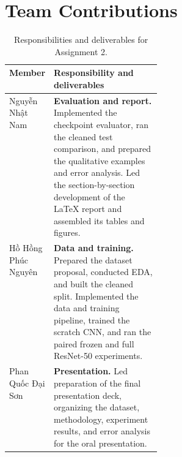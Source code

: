 \section{Team Contributions}
\label{app:a2-team-contributions}

\begin{table}[H]
  \centering
  \small
  \caption{Responsibilities and deliverables for Assignment 2.}
  \begin{tabularx}{\linewidth}{@{}>{\raggedright\arraybackslash}p{0.29\linewidth}Y@{}}
    \toprule
    Member & Responsibility and deliverables \\
    \midrule
    Nguyễn Nhật Nam
      & \textbf{Evaluation and report.} Implemented the checkpoint evaluator, ran the cleaned test comparison, and prepared the qualitative examples and error analysis. Led the section-by-section development of the LaTeX report and assembled its tables and figures. \\
    \addlinespace
    Hồ Hồng Phúc Nguyên
      & \textbf{Data and training.} Prepared the dataset proposal, conducted EDA, and built the cleaned split. Implemented the data and training pipeline, trained the scratch CNN, and ran the paired frozen and full ResNet-50 experiments. \\
    \addlinespace
    Phan Quốc Đại Sơn
      & \textbf{Presentation.} Led preparation of the final presentation deck, organizing the dataset, methodology, experiment results, and error analysis for the oral presentation. \\
    \bottomrule
  \end{tabularx}
\end{table}
